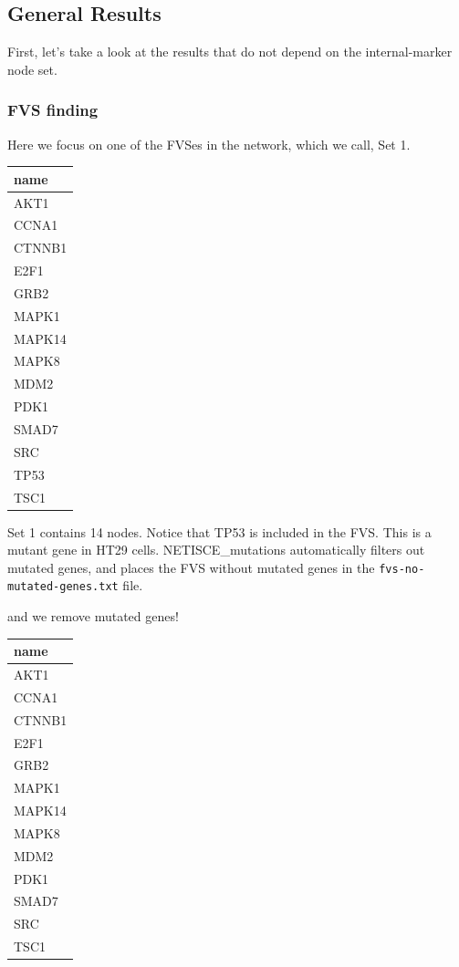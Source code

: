 \documentclass[
]{book}
\begin{document}
\hypertarget{general-results-1}{%
\subsection{General Results}\label{general-results-1}}

First, let's take a look at the results that do not depend on the internal-marker node set.

\hypertarget{section-id}{%
\subsubsection*{FVS finding}\label{section-id}}

Here we focus on one of the FVSes in the network, which we call, Set 1.

\begin{tabular}{l}
\hline
name\\
\hline
AKT1\\
\hline
CCNA1\\
\hline
CTNNB1\\
\hline
E2F1\\
\hline
GRB2\\
\hline
MAPK1\\
\hline
MAPK14\\
\hline
MAPK8\\
\hline
MDM2\\
\hline
PDK1\\
\hline
SMAD7\\
\hline
SRC\\
\hline
TP53\\
\hline
TSC1\\
\hline
\end{tabular}

Set 1 contains 14 nodes. Notice that TP53 is included in the FVS. This is a mutant gene in HT29 cells. NETISCE\_mutations automatically filters out mutated genes, and places the FVS without mutated genes in the \texttt{fvs-no-mutated-genes.txt} file.

and we remove mutated genes!

\begin{tabular}{l}
\hline
name\\
\hline
AKT1\\
\hline
CCNA1\\
\hline
CTNNB1\\
\hline
E2F1\\
\hline
GRB2\\
\hline
MAPK1\\
\hline
MAPK14\\
\hline
MAPK8\\
\hline
MDM2\\
\hline
PDK1\\
\hline
SMAD7\\
\hline
SRC\\
\hline
TSC1\\
\hline
\end{tabular}
\end{document}
